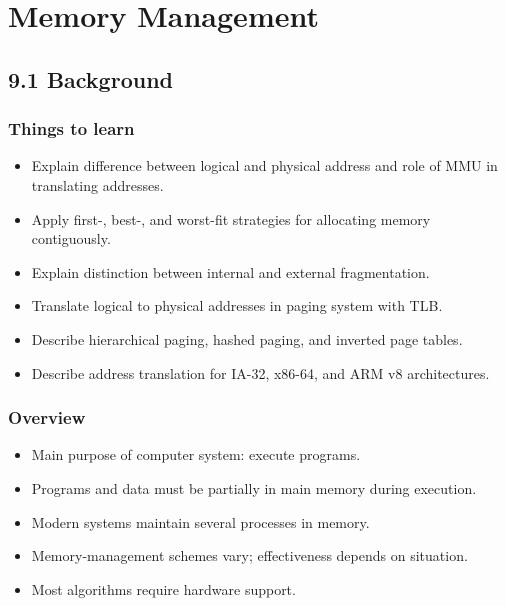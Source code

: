 \section{Memory Management}
\subsection{9.1 Background}

\subsubsection*{Things to learn}
\begin{itemize}
    \item Explain difference between logical and physical address and role of MMU in translating addresses.
    \item Apply first-, best-, and worst-fit strategies for allocating memory contiguously.
    \item Explain distinction between internal and external fragmentation.
    \item Translate logical to physical addresses in paging system with TLB.
    \item Describe hierarchical paging, hashed paging, and inverted page tables.
    \item Describe address translation for IA-32, x86-64, and ARM v8 architectures.
\end{itemize}

\subsubsection*{Overview}
\begin{itemize}
    \item Main purpose of computer system: execute programs.
    \item Programs and data must be partially in main memory during execution.
    \item Modern systems maintain several processes in memory.
    \item Memory-management schemes vary; effectiveness depends on situation.
    \item Most algorithms require hardware support.
\end{itemize}

